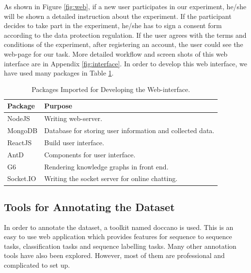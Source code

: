 \documentclass[bsc,frontabs,twoside,singlespacing,parskip,deptreport]{infthesis}     %
\begin{document}
As shown in Figure \ref{fig:web}, if a new user participates in our experiment, he/she will be shown a detailed instruction about the experiment. If the participant decides to take part in the experiment, he/she has to sign a consent form according to the data protection regulation. If the user agrees with the terms and conditions of the experiment, after registering an account, the user could see the web-page for our task. More detailed workflow and screen shots of this web interface are in Appendix \ref{fig:interface}. In order to develop this web interface, we have used many packages in Table \ref{tab:packages}.

\begin{table}[]
\centering
\begin{tabular}{|l|l|}
\hline
Package                  & Purpose                                                   \\ \hline
NodeJS\cite{nodejs}      & Writing web-server.                                       \\ \hline
MongoDB\cite{monodb}     & Database for storing user information and collected data. \\ \hline
ReactJS\cite{react}      & Build user interface.                                    \\ \hline
AntD\cite{antd}           & Components for user interface.                  \\ \hline
G6\cite{g6}              & Rendering knowledge graphs in front end.                   \\ \hline
Socket.IO\cite{socketio} & Writing the socket server for online chatting.                \\ \hline
\end{tabular}
\caption{Packages Imported for Developing the Web-interface.}
\label{tab:packages}
\end{table}


\subsection{Tools for Annotating the Dataset}

In order to annotate the dataset, a toolkit named doccano\cite{doccano} is used. This is an easy to use web application which provides features for sequence to sequence tasks, classification tasks and sequence labelling tasks. Many other annotation tools have also been explored. However, most of them are professional and complicated to set up.
\end{document}
